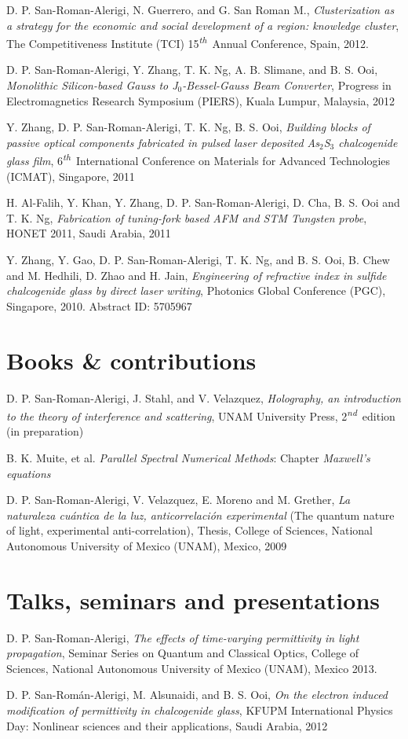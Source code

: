 \documentclass[margin,10pt]{res}
\renewcommand{\th}{\textsuperscript{\emph{th}}}
\newcommand{\nd}{\textsuperscript{\emph{nd}}}
\newcommand{\subs}[1]{\normalfont #1}
\newcommand{\secs}[1]{\normalsize{\section{\subs{#1}}}}
\newcommand{\UNAM}{National Autonomous University of Mexico (UNAM)}
\begin{document}
D. P. San-Roman-Alerigi, N. Guerrero, and G. San Roman M., \emph{Clusterization as a strategy for the economic and social development of a region: knowledge cluster}, The Competitiveness Institute (TCI) 15\th~Annual Conference, Spain, 2012.

D. P. San-Roman-Alerigi, Y. Zhang, T. K. Ng, A. B. Slimane, and B. S. Ooi, \emph{Monolithic Silicon-based Gauss to J$_0$-Bessel-Gauss Beam Converter}, Progress in Electromagnetics Research Symposium (PIERS), Kuala Lumpur, Malaysia, 2012

Y. Zhang, D. P. San-Roman-Alerigi, T. K. Ng, B. S. Ooi, \emph{Building blocks of passive optical components fabricated in pulsed laser deposited As$_2$S$_3$ chalcogenide glass film}, 6\th~International Conference on Materials for Advanced Technologies (ICMAT), Singapore, 2011

H. Al-Falih, Y. Khan, Y. Zhang, D. P. San-Roman-Alerigi, D. Cha, B. S. Ooi and T. K. Ng, \emph{Fabrication of tuning-fork based AFM and STM Tungsten probe}, HONET 2011, Saudi Arabia, 2011

Y. Zhang, Y. Gao, D. P. San-Roman-Alerigi, T. K. Ng, and B. S. Ooi, B. Chew and M. Hedhili, D. Zhao and H. Jain, \emph{Engineering of refractive index in sulfide chalcogenide glass by direct laser writing}, Photonics Global Conference (PGC), Singapore, 2010. Abstract ID: 5705967


\secs{Books \& contributions}

D. P. San-Roman-Alerigi, J. Stahl, and V. Velazquez, \emph{Holography, an introduction to the theory of interference and scattering}, UNAM University Press, 2\nd~edition (in preparation)

B. K. Muite, et al. \emph{Parallel Spectral Numerical Methods}: Chapter \emph{Maxwell's equations}

D. P. San-Roman-Alerigi, V. Velazquez, E. Moreno and M. Grether, \emph{La naturaleza cu\'antica de la luz, anticorrelaci\'on experimental} (The quantum nature of light, experimental anti-correlation), Thesis, College of Sciences, \UNAM, Mexico, 2009


\secs{Talks, seminars and presentations}

D. P. San-Roman-Alerigi, \emph{The effects of time-varying permittivity in light propagation}, Seminar Series on Quantum and Classical Optics, College of Sciences, \UNAM, Mexico 2013.

D. P. San-Román-Alerigi, M. Alsunaidi, and B. S. Ooi, \emph{On the electron induced modification of permittivity in chalcogenide glass}, KFUPM International Physics Day: Nonlinear sciences and their applications, Saudi Arabia, 2012
\end{document}
